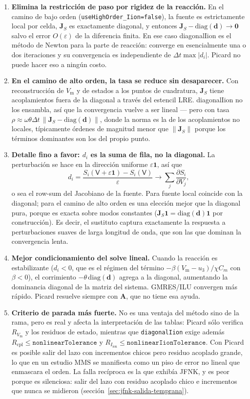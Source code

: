 \documentclass[11pt,a4paper]{article}
\newcommand{\code}[1]{\texttt{\small #1}}
\newcommand{\Vm}{V_{\text{m}}}
\newcommand{\Iion}{I_{\mathrm{ion}}}
\newcommand{\Aimp}{\mathbf{A}}
\newcommand{\norm}[1]{\left\lVert #1 \right\rVert}
\begin{document}
\begin{enumerate}
\item \textbf{Elimina la restricción de paso por rigidez de la reacción.} En el camino de bajo orden (\code{useHighOrder\_Iion=false}), la fuente es estrictamente local por celda, $\mathbf{J}_S$ es exactamente diagonal, y entonces $\mathbf{J}_S-\mathrm{diag}(\mathbf{d})\to\mathbf{0}$ salvo el error $O(\varepsilon)$ de la diferencia finita. En ese caso diagonalIion es el método de Newton para la parte de reacción: converge en esencialmente una o dos iteraciones y su convergencia es independiente de $\Delta t\max|d_i|$. Picard no puede hacer eso a ningún costo.
\item \textbf{En el camino de alto orden, la tasa se reduce sin desaparecer.} Con reconstrucción de $\Vm$ y de estados a los puntos de cuadratura, $\mathbf{J}_S$ tiene acoplamientos fuera de la diagonal a través del estencil LRE. diagonalIion no los ensambla, así que la convergencia vuelve a ser lineal — pero con tasa $\rho\approx\omega\theta\Delta t\,\norm{\mathbf{J}_S-\mathrm{diag}(\mathbf{d})}$, donde la norma es la de los acoplamientos no locales, típicamente órdenes de magnitud menor que $\norm{\mathbf{J}_S}$ porque los términos dominantes son los del propio punto.
\item \textbf{Detalle fino a favor: $d_i$ es la suma de fila, no la diagonal.} La perturbación se hace en la dirección uniforme $\varepsilon\mathbf{1}$, así que $$d_i=\frac{S_i(\mathsf{V}+\varepsilon\mathbf{1})-S_i(\mathsf{V})}{\varepsilon}\longrightarrow\sum_j\frac{\partial S_i}{\partial V_j},$$ o sea el row-sum del Jacobiano de la fuente. Para fuente local coincide con la diagonal; para el camino de alto orden es una elección mejor que la diagonal pura, porque es exacta sobre modos constantes ($\mathbf{J}_S\mathbf{1}=\mathrm{diag}(\mathbf{d})\mathbf{1}$ por construcción). Es decir, el sustituto captura exactamente la respuesta a perturbaciones suaves de larga longitud de onda, que son las que dominan la convergencia lenta.
\item \textbf{Mejor condicionamiento del solve lineal.} Cuando la reacción es estabilizante ($d_i<0$, que es el régimen del término $-\beta(\Vm-u_3)/\chi C_m$ con $\beta<0$), el corrimiento $-\theta\,\mathrm{diag}(\mathbf{d})$ agrega a la diagonal, aumentando la dominancia diagonal de la matriz del sistema. GMRES/ILU convergen más rápido. Picard resuelve siempre con $\Aimp$, que no tiene esa ayuda.
\item \textbf{Criterio de parada más fuerte.} No es una ventaja del método sino de la rama, pero es real y afecta la interpretación de las tablas: Picard sólo verifica $R_{\Vm}$ y los residuos de estado, mientras que \code{diagonalIion} exige además $R_{\mathrm{cpl}}\le\texttt{nonlinearTolerance}$ y $R_{\Iion}\le\texttt{nonlinearIionTolerance}$. Con Picard es posible salir del lazo con incrementos chicos pero residuo acoplado grande, lo que en un estudio MMS se manifiesta como un piso de error no lineal que enmascara el orden. La falla recíproca es la que exhibía JFNK, y es peor porque es silenciosa: salir del lazo con residuo acoplado chico e incrementos que nunca se midieron (sección~\ref{sec:jfnk-salida-temprana}). 
\end{enumerate}
\end{document}
